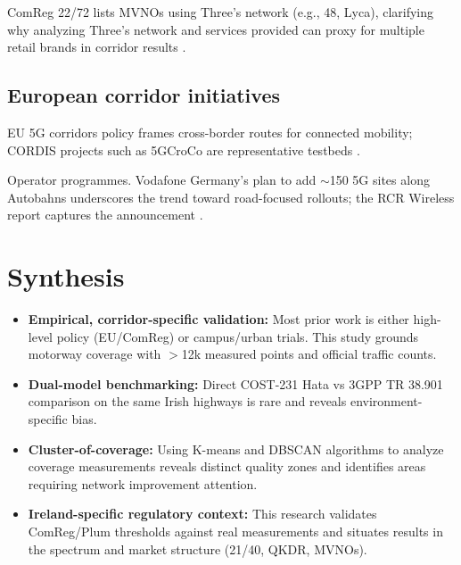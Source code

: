 \documentclass[MScCS]{uccthesis}
\begin{document}
ComReg 22/72 lists MVNOs using Three's network (e.g., 48, Lyca), clarifying why analyzing Three's network and services provided can proxy for multiple retail brands in corridor results \cite{mvnodetails_three_ie}.

\begin{center}
\end{center}

\subsection{European corridor initiatives}

EU 5G corridors policy frames cross-border routes for connected mobility; CORDIS projects such as 5GCroCo are representative testbeds \cite{eu2016_action_plan, 5gcroc_project}.

Operator programmes. Vodafone Germany's plan to add $\sim$150 5G sites along Autobahns underscores the trend toward road-focused rollouts; the RCR Wireless report captures the announcement \cite{vodafone_autobahn}.

\section{Synthesis}

\begin{itemize}
\item \textbf{Empirical, corridor-specific validation:} Most prior work is either high-level policy (EU/ComReg) or campus/urban trials. This study grounds motorway coverage with $>$12k measured points and official traffic counts.

\item \textbf{Dual-model benchmarking:} Direct COST-231 Hata vs 3GPP TR 38.901 comparison on the same Irish highways is rare and reveals environment-specific bias.

\item \textbf{Cluster-of-coverage:} Using K-means and DBSCAN algorithms to analyze coverage measurements reveals distinct quality zones and identifies areas requiring network improvement attention.

\item \textbf{Ireland-specific regulatory context:} This research validates ComReg/Plum thresholds against real measurements and situates results in the spectrum and market structure (21/40, QKDR, MVNOs).
\end{itemize}
\end{document}
